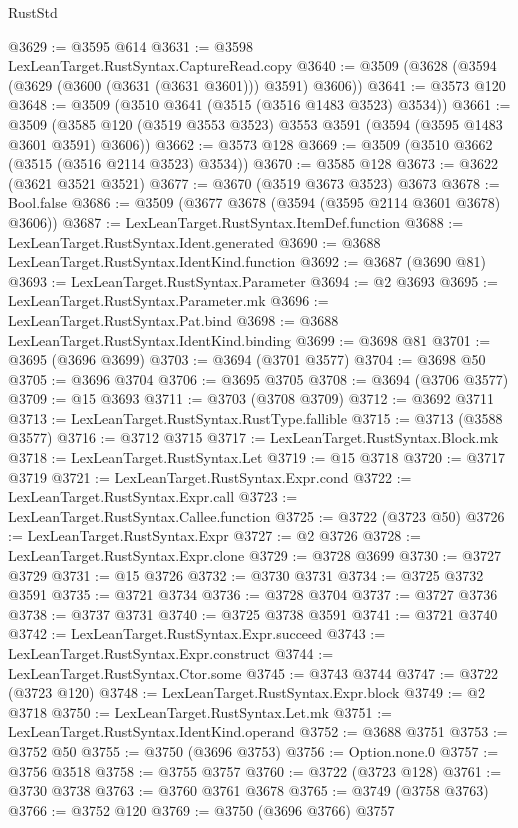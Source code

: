 \begin{lexlean}{RustStd}
\begin{coremodule}
@3629 := @3595 @614
@3631 := @3598 LexLeanTarget.RustSyntax.CaptureRead.copy
@3640 := @3509 (@3628 (@3594 (@3629 (@3600 (@3631 (@3631 @3601))) @3591) @3606))
@3641 := @3573 @120
@3648 := @3509 (@3510 @3641 (@3515 (@3516 @1483 @3523) @3534))
@3661 := @3509 (@3585 @120 (@3519 @3553 @3523) @3553 @3591 (@3594 (@3595 @1483 @3601 @3591) @3606))
@3662 := @3573 @128
@3669 := @3509 (@3510 @3662 (@3515 (@3516 @2114 @3523) @3534))
@3670 := @3585 @128
@3673 := @3622 (@3621 @3521 @3521)
@3677 := @3670 (@3519 @3673 @3523) @3673
@3678 := Bool.false
@3686 := @3509 (@3677 @3678 (@3594 (@3595 @2114 @3601 @3678) @3606))
@3687 := LexLeanTarget.RustSyntax.ItemDef.function
@3688 := LexLeanTarget.RustSyntax.Ident.generated
@3690 := @3688 LexLeanTarget.RustSyntax.IdentKind.function
@3692 := @3687 (@3690 @81)
@3693 := LexLeanTarget.RustSyntax.Parameter
@3694 := @2 @3693
@3695 := LexLeanTarget.RustSyntax.Parameter.mk
@3696 := LexLeanTarget.RustSyntax.Pat.bind
@3698 := @3688 LexLeanTarget.RustSyntax.IdentKind.binding
@3699 := @3698 @81
@3701 := @3695 (@3696 @3699)
@3703 := @3694 (@3701 @3577)
@3704 := @3698 @50
@3705 := @3696 @3704
@3706 := @3695 @3705
@3708 := @3694 (@3706 @3577)
@3709 := @15 @3693
@3711 := @3703 (@3708 @3709)
@3712 := @3692 @3711
@3713 := LexLeanTarget.RustSyntax.RustType.fallible
@3715 := @3713 (@3588 @3577)
@3716 := @3712 @3715
@3717 := LexLeanTarget.RustSyntax.Block.mk
@3718 := LexLeanTarget.RustSyntax.Let
@3719 := @15 @3718
@3720 := @3717 @3719
@3721 := LexLeanTarget.RustSyntax.Expr.cond
@3722 := LexLeanTarget.RustSyntax.Expr.call
@3723 := LexLeanTarget.RustSyntax.Callee.function
@3725 := @3722 (@3723 @50)
@3726 := LexLeanTarget.RustSyntax.Expr
@3727 := @2 @3726
@3728 := LexLeanTarget.RustSyntax.Expr.clone
@3729 := @3728 @3699
@3730 := @3727 @3729
@3731 := @15 @3726
@3732 := @3730 @3731
@3734 := @3725 @3732 @3591
@3735 := @3721 @3734
@3736 := @3728 @3704
@3737 := @3727 @3736
@3738 := @3737 @3731
@3740 := @3725 @3738 @3591
@3741 := @3721 @3740
@3742 := LexLeanTarget.RustSyntax.Expr.succeed
@3743 := LexLeanTarget.RustSyntax.Expr.construct
@3744 := LexLeanTarget.RustSyntax.Ctor.some
@3745 := @3743 @3744
@3747 := @3722 (@3723 @120)
@3748 := LexLeanTarget.RustSyntax.Expr.block
@3749 := @2 @3718
@3750 := LexLeanTarget.RustSyntax.Let.mk
@3751 := LexLeanTarget.RustSyntax.IdentKind.operand
@3752 := @3688 @3751
@3753 := @3752 @50
@3755 := @3750 (@3696 @3753)
@3756 := Option.none.{0}
@3757 := @3756 @3518
@3758 := @3755 @3757
@3760 := @3722 (@3723 @128)
@3761 := @3730 @3738
@3763 := @3760 @3761 @3678
@3765 := @3749 (@3758 @3763)
@3766 := @3752 @120
@3769 := @3750 (@3696 @3766) @3757

\end{coremodule}
\end{lexlean}
